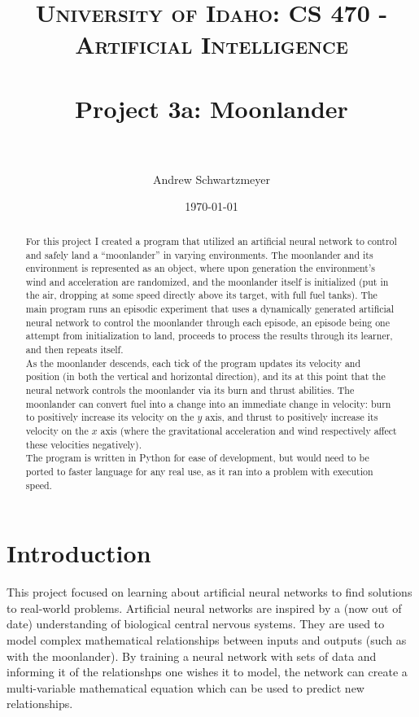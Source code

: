 \documentclass[12pt, article]{scrartcl}
\title{	
\normalfont \normalsize 
\textsc{University of Idaho: CS 470 - Artificial Intelligence} \\ [25pt]
\horrule{0.5pt} \\[0.4cm]
\huge Project 3a: Moonlander\\
\horrule{2pt} \\[0.5cm]
}
\author{Andrew Schwartzmeyer}
\date{\normalsize\today}
\begin{document}
\maketitle 
\begin{abstract}
For this project I created a program that utilized an artificial neural network to control and safely land a ``moonlander'' in varying environments. The moonlander and its environment is represented as an object, where upon generation the environment's wind and acceleration are randomized, and the moonlander itself is initialized (put in the air, dropping at some speed directly above its target, with full fuel tanks). The main program runs an episodic experiment that uses a dynamically generated artificial neural network to control the moonlander through each episode, an episode being one attempt from initialization to land, proceeds to process the results through its learner, and then repeats itself. \\

As the moonlander descends, each tick of the program updates its velocity and position (in both the vertical and horizontal direction), and its at this point that the neural network controls the moonlander via its burn and thrust abilities. The moonlander can convert fuel into a change into an immediate change in velocity: burn to positively increase its velocity on the $y$ axis, and thrust to positively increase its velocity on the $x$ axis (where the gravitational acceleration and wind respectively affect these velocities negatively). \\

The program is written in Python for ease of development, but would need to be ported to faster language for any real use, as it ran into a problem with execution speed. \\
\end{abstract}
\pagebreak
\section{Introduction}
This project focused on learning about artificial neural networks to find solutions to real-world problems. Artificial neural networks are inspired by a (now out of date) understanding of biological central nervous systems. They are used to model complex mathematical relationships between inputs and outputs (such as with the moonlander). By training a neural network with sets of data and informing it of the relationshps one wishes it to model, the network can create a multi-variable mathematical equation which can be used to predict new relationships. \\
\end{document}
